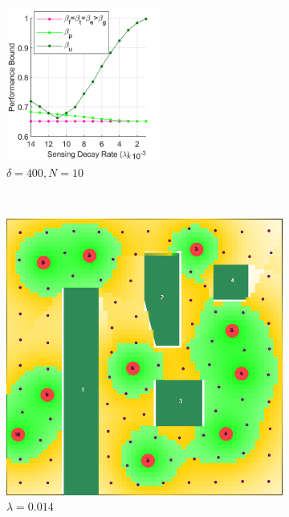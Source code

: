 \documentclass[conference]{IEEEtran}
\begin{document}
\begin{figure}[t]
    \centering
    \begin{subfigure}[t]{\columnwidth}
        \centering
        \includegraphics[width=2in]{Figures/Gen2.png}
        \caption{$\delta=400, N=10$}
    \end{subfigure}%
    \\
    \centering
    \begin{subfigure}[t]{0.105\textwidth}
        \centering
        \includegraphics[width=\textwidth]{Figures/Gen2_1.png}
        \caption{$\lambda=0.014$}
    \end{subfigure}\hspace{3mm}
    \begin{subfigure}[t]{0.105\textwidth}
        \centering

\end{subfigure}
\end{figure}
\end{document}

